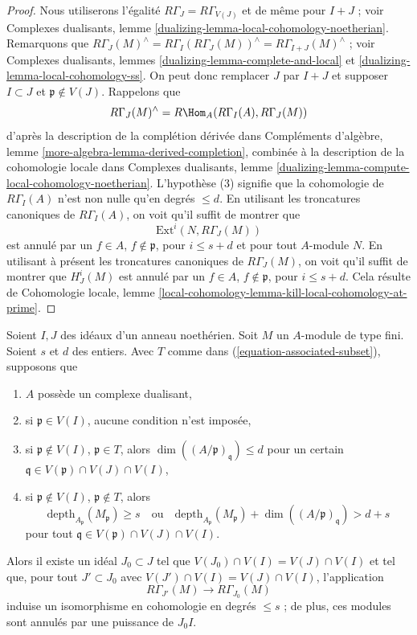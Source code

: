 \begin{proof}
Nous utiliserons l'égalité $R\Gamma_J = R\Gamma_{V(J)}$ et de même pour
$I + J$ ; voir
Complexes dualisants, lemme \ref{dualizing-lemma-local-cohomology-noetherian}.
Remarquons que
$R\Gamma_J(M)^\wedge = R\Gamma_I(R\Gamma_J(M))^\wedge =
R\Gamma_{I + J}(M)^\wedge$ ; voir
Complexes dualisants, lemmes
\ref{dualizing-lemma-complete-and-local} et
\ref{dualizing-lemma-local-cohomology-ss}.
On peut donc remplacer $J$ par $I + J$ et supposer $I \subset J$
et $\mathfrak p \not \in V(J)$.
Rappelons que
$$
R\Gamma_J(M)^\wedge = R\Hom_A(R\Gamma_I(A), R\Gamma_J(M))
$$
d'après la description de la complétion dérivée dans
Compléments d'algèbre, lemme \ref{more-algebra-lemma-derived-completion},
combinée à la description de la cohomologie locale dans
Complexes dualisants, lemme
\ref{dualizing-lemma-compute-local-cohomology-noetherian}.
L'hypothèse (3) signifie que la cohomologie de $R\Gamma_I(A)$ n'est non nulle
qu'en degrés $\leq d$. En utilisant les troncatures canoniques de
$R\Gamma_I(A)$, on voit qu'il suffit de montrer que
$$
\text{Ext}^i(N, R\Gamma_J(M))
$$
est annulé par un $f \in A$, $f \not \in \mathfrak p$, pour
$i \leq s + d$ et pour tout $A$-module $N$.
En utilisant à présent les troncatures canoniques de $R\Gamma_J(M)$,
on voit qu'il suffit de montrer que
$H^i_J(M)$ est annulé par un $f \in A$, $f \not \in \mathfrak p$,
pour $i \leq s + d$.
Cela résulte de Cohomologie locale, lemme
\ref{local-cohomology-lemma-kill-local-cohomology-at-prime}.
\end{proof}

\begin{lemma}
\label{lemma-kill-colimit-weak-general}
Soient $I, J$ des idéaux d'un anneau noethérien. Soit $M$ un $A$-module de type fini.
Soient $s$ et $d$ des entiers. Avec $T$ comme dans
(\ref{equation-associated-subset}), supposons que
\begin{enumerate}
\item $A$ possède un complexe dualisant,
\item si $\mathfrak p \in V(I)$, aucune condition n'est imposée,
\item si $\mathfrak p \not \in V(I)$, $\mathfrak p \in T$, alors
$\dim((A/\mathfrak p)_\mathfrak q) \leq d$ pour un certain
$\mathfrak q \in V(\mathfrak p) \cap V(J) \cap V(I)$,
\item si $\mathfrak p \not \in V(I)$, $\mathfrak p \not \in T$, alors
$$
\text{depth}_{A_\mathfrak p}(M_\mathfrak p) \geq s
\quad\text{ou}\quad
\text{depth}_{A_\mathfrak p}(M_\mathfrak p) +
\dim((A/\mathfrak p)_\mathfrak q) > d + s
$$
pour tout $\mathfrak q \in V(\mathfrak p) \cap V(J) \cap V(I)$.
\end{enumerate}
Alors il existe un idéal $J_0 \subset J$ tel que
$V(J_0) \cap V(I) = V(J) \cap V(I)$ et tel que, pour tout $J' \subset J_0$ avec
$V(J') \cap V(I) = V(J) \cap V(I)$, l'application
$$
R\Gamma_{J'}(M) \longrightarrow R\Gamma_{J_0}(M)
$$
induise un isomorphisme en cohomologie en degrés $\leq s$ ;
de plus, ces modules sont annulés par une puissance de $J_0I$.
\end{lemma}

